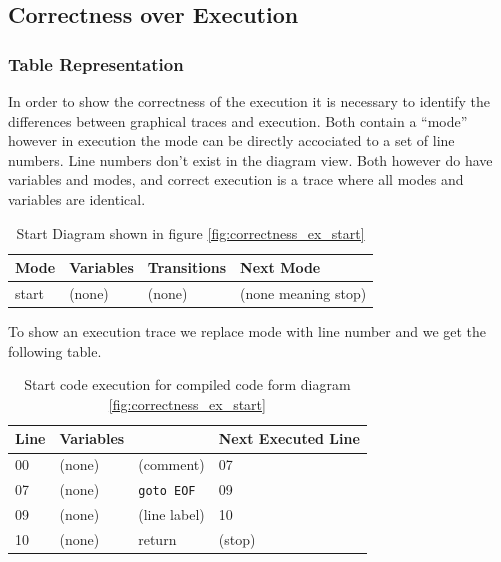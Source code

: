 \subsection{Correctness over Execution}
\subsubsection{Table Representation}

In order to show the correctness of the execution it is necessary to identify the differences between graphical traces and execution. Both contain a ``mode'' however in execution the mode can be directly accociated to a set of line numbers. Line numbers don't exist in the diagram view. Both however do have variables and modes, and correct execution is a trace where all modes and variables are identical.

\begin{table}[htcb]
	\caption{Start Diagram shown in figure \ref{fig:correctness_ex_start}}
	\centering
		\begin{tabular}{| l | l | l | l |}
			\hline
			\textbf{Mode} & \textbf{Variables} & \textbf{Transitions} & \textbf{Next Mode} \\
			\hline
			start & (none) & (none) & (none meaning stop) \\
			\hline
		\end{tabular}
	\label{table:BasicDiagOnly}
\end{table}

To show an execution trace we replace mode with line number and we get the following table.

\begin{table}[htcb]
	\caption{Start code execution for compiled code form diagram \ref{fig:correctness_ex_start}}
	\centering
		\begin{tabular}{| l | l | l | l |}
			\hline
			\textbf{Line} & \textbf{Variables} & \text{Code} & \textbf{Next Executed Line} \\
			\hline
			00 & (none) & (comment) & 07 \\
			\hline
			07 & (none) & \texttt{goto EOF} & 09 \\
			\hline
			09 & (none) & (line label) & 10 \\
			\hline
			10 & (none) & return & (stop) \\
			\hline
		\end{tabular}
	\label{table:BasicExecOnly}
\end{table}
			
